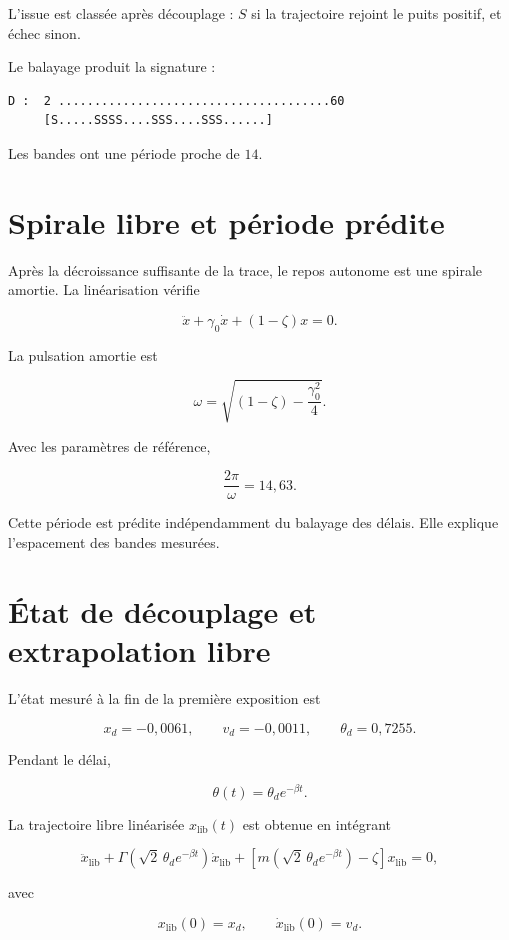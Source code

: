 L'issue est classée après découplage : \(S\) si la trajectoire rejoint
le puits positif, et échec sinon.

Le balayage produit la signature :

\begin{verbatim}
D :  2 ......................................60
     [S.....SSSS....SSS....SSS......]
\end{verbatim}

Les bandes ont une période proche de \(14\).

\section{Spirale libre et période prédite}
\label{annexe-num-spirale-libre}

Après la décroissance suffisante de la trace, le repos autonome est une
spirale amortie. La linéarisation vérifie

\[
\ddot x+\gamma_0\dot x+(1-\zeta)x=0.
\]

La pulsation amortie est

\[
\boxed{
\omega
=
\sqrt{(1-\zeta)-\frac{\gamma_0^2}{4}}
}.
\]

Avec les paramètres de référence,

\[
\boxed{
\frac{2\pi}{\omega}=14{,}63.
}
\]

Cette période est prédite indépendamment du balayage des délais. Elle
explique l'espacement des bandes mesurées.

\section{État de découplage et extrapolation libre}
\label{annexe-num-extrapolation-libre}

L'état mesuré à la fin de la première exposition est

\[
x_d=-0{,}0061,
\qquad
v_d=-0{,}0011,
\qquad
\theta_d=0{,}7255.
\]

Pendant le délai,

\[
\theta(t)=\theta_de^{-\beta t}.
\]

La trajectoire libre linéarisée \(x_{\mathrm{lib}}(t)\) est obtenue en
intégrant

\[
\ddot x_{\mathrm{lib}}
+
\Gamma\!\left(\sqrt2\,\theta_de^{-\beta t}\right)
\dot x_{\mathrm{lib}}
+
\left[
m\!\left(\sqrt2\,\theta_de^{-\beta t}\right)-\zeta
\right]
x_{\mathrm{lib}}
=0,
\]

avec

\[
x_{\mathrm{lib}}(0)=x_d,
\qquad
\dot x_{\mathrm{lib}}(0)=v_d.
\]

